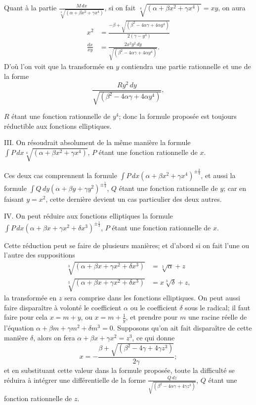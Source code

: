 \documentclass{article}
\begin{document}
Quant à la partie $\frac{M\,dx}{\sqrt[4]{(\alpha+\beta x^{2}+\gamma x^{4})}}$, si on fait $\sqrt[4]{(\alpha+\beta x^{2}+\gamma x^{4})}=xy$, on aura
\[ \begin{aligned} x^{2}&=\frac{-\beta+\sqrt{(\beta^{2}-4\alpha\gamma+4\alpha y^{4})}}{2(\gamma-y^{4})}\\ \frac{dx}{xy}&=\frac{2x^{2}y^{2}\,dy}{\sqrt{(\beta^{2}-4\alpha\gamma+4\alpha y^{4})}}. \end{aligned} \]
D'où l'on voit que la transformée en $y$ contiendra une partie rationnelle et une de la forme
\[ \frac{Ry^{2}\,dy}{\sqrt{(\beta^{2}-4\alpha\gamma+4\alpha y^{4})}}, \]

$R$ étant une fonction rationnelle de $y^{4}$; donc la formule proposée est toujours réductible aux fonctions elliptiques.

III. On résoudrait absolument de la même manière la formule $\displaystyle\int P\,dx\sqrt[4]{(\alpha+\beta x^{2}+\gamma x^{4})}$, $P$ étant une fonction rationnelle de $x$.

Ces deux cas comprennent la formule $\displaystyle\int P\,dx(\alpha+\beta x^{2}+\gamma x^{4})^{\pm\frac{3}{4}}$, et aussi la formule $\displaystyle\int Q\,dy(\alpha+\beta y+\gamma y^{2})^{\pm\frac{1}{4}}$, $Q$ étant une fonction rationnelle de $y$; car en faisant $y=x^{2}$, cette dernière devient un cas particulier des deux autres.

IV. On peut réduire aux fonctions elliptiques la formule $\displaystyle\int P\,dx(\alpha+\beta x+\gamma x^{2}+\delta x^{3})^{\pm\frac{1}{3}}$, $P$ étant une fonction rationnelle de $x$.

Cette réduction peut se faire de plusieurs manières; et d'abord si on fait l'une ou l'autre des suppositions
\[ \begin{aligned} \sqrt[3]{(\alpha+\beta x+\gamma x^{2}+\delta x^{3})}&=\sqrt[3]{\alpha}+z\\ \sqrt[3]{(\alpha+\beta x+\gamma x^{2}+\delta x^{3})}&=x\sqrt[3]{\delta}+z, \end{aligned} \]
la transformée en $z$ sera comprise dans les fonctions elliptiques. On peut aussi faire disparaître à volonté le coefficient $\alpha$ ou le coefficient $\delta$ sous le radical; il faut faire pour cela $x=m+y$, ou $x=m+\frac{1}{y}$, et prendre pour $m$ une racine réelle de l'équation $\alpha+\beta m+\gamma m^{2}+\delta m^{3}=0$. Supposons qu'on ait fait disparaître de cette manière $\delta$, alors on fera $\alpha+\beta x+\gamma x^{2}=z^{3}$, ce qui donne
\[ x=-\frac{\beta+\sqrt{(\beta^{2}-4\gamma+4\gamma z^{3})}}{2\gamma}; \]
et en substituant cette valeur dans la formule proposée, toute la difficulté se réduira à intégrer une différentielle de la forme $\frac{Q\,dz}{\sqrt{(\beta^{2}-4\alpha\gamma+4\gamma z^{3})}}$, $Q$ étant une fonction rationnelle de $z$.
\end{document}
